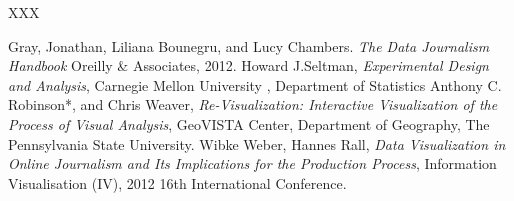 \documentclass[10pt,journal,compsoc]{IEEEtran}
\begin{document}
XXX

\begin{thebibliography}{99}
{} Gray, Jonathan, Liliana Bounegru, and Lucy Chambers. \textit{The Data Journalism Handbook} Oreilly \& Associates, 2012.
 Howard J.Seltman, \textit{Experimental Design and Analysis}, Carnegie Mellon University , Department of Statistics
 Anthony C. Robinson*, and Chris Weaver, \textit{Re-Visualization: Interactive Visualization of the Process of Visual Analysis}, GeoVISTA Center, Department of Geography, The Pennsylvania State University. 
 Wibke Weber, Hannes Rall, \textit{Data Visualization in Online Journalism and Its Implications for the Production Process}, Information Visualisation (IV), 2012 16th International Conference.

\end{thebibliography}
\end{document}

